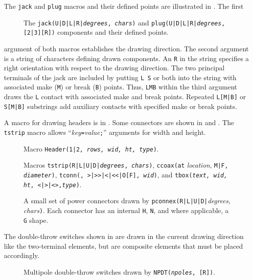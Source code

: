 The {\tt jack} and {\tt plug} macros and their defined points are
illustrated in .
The first
\begin{figure}[H]
   
   \vspace{-1ex}
   \caption{The {\tt jack(U|D|L|R|{\sl degrees}, {\sl chars})}
    and {\tt plug(U|D|L|R|{\sl degrees},[2|3][R])} components
    and their defined points.}
   \label{Jack}
   \end{figure}
\noindent%
argument of both macros establishes the drawing direction.
 The second argument is a string of characters defining drawn components.
 An {\tt R} in the string specifies a
 right orientation with respect to the drawing direction.
 The two principal terminals of
 the jack are included by putting \hbox{{\tt L} {\tt S}}
 or both into the string with associated make ({\tt M})
 or break ({\tt B}) points.  Thus, {\tt LMB} within the third
 argument draws the {\tt L} contact with
 associated make and break points. Repeated {\tt L[M|B]}
 or {\tt S[M|B]} substrings add auxiliary contacts with 
 specified make or break points.

A macro for drawing headers is in .
Some connectors are shown in  and .
The {\tt tstrip} macro allows ``{\sl key}{\tt =}{\sl value}{\tt ;}'' arguments
for width and height.
\begin{figure}[h!t]
   
   \caption{Macro {\tt Header(1|2, {\sl rows, wid, ht, type})}.}
   \label{Headers}
   \end{figure}
\begin{figure}[h!t]
   
   \caption{Macros {\tt tstrip(R|L|U|D|{\sl degrees}, {\sl chars})},
     {\tt ccoax(at} {\sl location}, {\tt M|F, {\sl diameter})},
     {\tt tconn(\linespec, >|>>|<|<<|O[F], {\sl wid})}, and
     {\tt tbox({\sl text, wid, ht}, <|>|<>,{\sl type})}. }
   \label{Conn}
   \end{figure}
\begin{figure}[h!t]
   
   \caption{A small set of power connectors drawn by
    {\tt pconnex(R|L|U|D|}{\sl degrees, chars}{\tt)}. Each connector has
    an internal {\tt H}, {\tt N}, and where applicable, a {\tt G} shape.}
   \label{Pconn}
   \end{figure}

The double-throw switches shown in  are drawn in the
current drawing direction like the two-terminal elements, but are
composite elements that must be placed accordingly.
\begin{figure}[h!t]
   
   \caption{Multipole double-throw switches drawn by
    {\tt NPDT({\sl npoles}, [R])}.}
   \label{NPDT}
   \end{figure}

